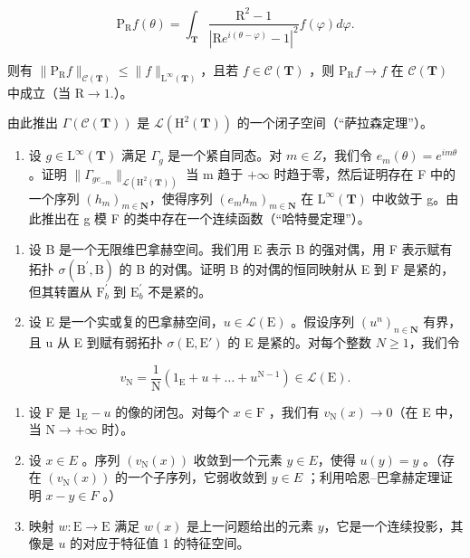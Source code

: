 \[
\mathrm{P} _ {\mathrm{R}} f (\theta) = \int_ {\mathbf {T}} \frac {\mathrm{R} ^ {2} - 1}{| \mathrm{R} e ^ {i (\theta - \varphi)} - 1 | ^ {2}} f (\varphi) d \varphi .
\]

则有 \(\| \mathrm{P}_{\mathrm{R}}f\|_{\mathcal{C}(\mathbf{T})}\leqslant \| f\|_{\mathrm{L}^{\infty}(\mathbf{T})}\)，且若 \(f\in \mathcal{C}(\mathbf{T})\) ，则 \(\mathrm{P_R}f\to f\) 在 \(\mathcal{C}(\mathbf{T})\) 中成立（当 \(\mathrm{R}\rightarrow 1.\)）。

由此推出 \(\Gamma(\mathcal{C}(\mathbf{T}))\) 是 \(\mathcal{L}(\mathrm{H}^{2}(\mathbf{T}))\) 的一个闭子空间（“萨拉森定理”）。

\begin{enumerate}
\def\labelenumi{\alph{enumi})}
\setcounter{enumi}{7}
\tightlist
\item
  设 \(g \in \mathrm{L}^{\infty}(\mathbf{T})\) 满足 \(\Gamma_{g}\) 是一个紧自同态。对 \(m \in Z\)，我们令 \(e_{m}(\theta) = e^{im\theta}\) 。证明 \(\|\Gamma_{ge_{-m}}\|_{\mathcal{L}(\mathrm{H}^{2}(\mathbf{T}))}\) 当 m 趋于 \(+\infty\) 时趋于零，然后证明存在 F 中的一个序列 \((h_{m})_{m \in \mathbf{N}}\)，使得序列 \((e_{m}h_{m})_{m \in \mathbf{N}}\) 在 \(\mathrm{L}^{\infty}(\mathbf{T})\) 中收敛于 g。由此推出在 g 模 F 的类中存在一个连续函数（“哈特曼定理”）。
\end{enumerate}

\begin{enumerate}
\def\labelenumi{\arabic{enumi})}
\setcounter{enumi}{22}
\item
  设 B 是一个无限维巴拿赫空间。我们用 E 表示 B 的强对偶，用 F 表示赋有拓扑 \(\sigma(\mathrm{B}^{\prime},\mathrm{B})\) 的 B 的对偶。证明 B 的对偶的恒同映射从 E 到 F 是紧的，但其转置从 \(\mathrm{F}_{b}^{\prime}\) 到 \(\mathrm{E}_{b}^{\prime}\) 不是紧的。
\item
  设 E 是一个实或复的巴拿赫空间，\(u \in \mathcal{L}(\mathrm{E})\) 。假设序列 \((u^{n})_{n \in \mathbf{N}}\) 有界，且 u 从 E 到赋有弱拓扑 \(\sigma(\mathrm{E}, \mathrm{E}')\) 的 E 是紧的。对每个整数 \(N \geqslant 1\)，我们令
\end{enumerate}

\[
v _ {\mathrm{N}} = \frac {1}{\mathrm{N}} (1 _ {\mathrm{E}} + u + \dots + u ^ {\mathrm{N-1}}) \in \mathcal {L} (\mathrm{E}).
\]

\begin{enumerate}
\def\labelenumi{\alph{enumi})}
\item
  设 F 是 \(1_{\mathrm{E}} - u\) 的像的闭包。对每个 \(x \in \mathrm{F}\) ，我们有 \(v_{\mathrm{N}}(x) \to 0\)（在 E 中，当 \(\mathrm{N} \to +\infty\) 时）。
\item
  设 \(x \in E\) 。序列 \((v_{\mathrm{N}}(x))\) 收敛到一个元素 \(y \in E\)，使得 \(u(y) = y\) 。（存在 \((v_{\mathrm{N}}(x))\) 的一个子序列，它弱收敛到 \(y \in E\) ；利用哈恩–巴拿赫定理证明 \(x - y \in F\) 。）
\item
  映射 \(w \colon \mathrm{E} \to \mathrm{E}\) 满足 \(w(x)\) 是上一问题给出的元素 \(y\)，它是一个连续投影，其像是 \(u\) 的对应于特征值 1 的特征空间。
\end{enumerate}

